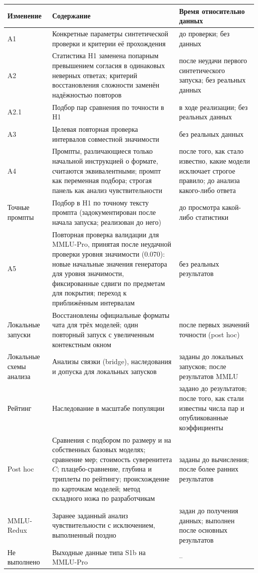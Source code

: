\documentclass[preprint,12pt,authoryear]{elsarticle}
\begin{document}
{\renewcommand{\arraystretch}{1.25}%
\begin{longtable}{@{}>{\raggedright\arraybackslash}p{}>{\raggedright\arraybackslash}p{}>{\raggedright\arraybackslash}p{}@{}}
\toprule
Изменение & Содержание & Время относительно данных \\
\midrule
\endhead
A1 & Конкретные параметры синтетической проверки и критерии её прохождения & до проверки; без данных \\
A2 & Статистика H1 заменена попарным превышением согласия в одинаковых неверных ответах; критерий восстановления сложности заменён надёжностью повторов & после неудачи первого синтетического запуска; без реальных данных \\
A2.1 & Подбор пар сравнения по точности в H1 & в ходе реализации; без реальных данных \\
A3 & Целевая повторная проверка интервалов совместной значимости & без реальных данных \\
A4 & Промпты, различающиеся только начальной инструкцией о формате, считаются эквивалентными; промпт как переменная подбора; строгая панель как анализ чувствительности & после того, как стало известно, какие модели исключает строгое правило; до анализа какого-либо ответа \\
Точные промпты & Подбор в H1 по точному тексту промпта (задокументирован после начала запуска; реализован до него) & до просмотра какой-либо статистики \\
A5 & Повторная проверка валидации для MMLU-Pro, принятая после неудачной проверки уровня значимости (0.070): новые начальные значения генератора для уровня значимости, фиксированные сдвиги по предметам для покрытия; переход к приближённым интервалам & без реальных результатов \\
Локальные запуски & Восстановлены официальные форматы чата для трёх моделей; один повторный запуск с увеличенным контекстным окном & после первых значений точности (post hoc) \\
Локальные схемы анализа & Анализы связки (bridge), наследования и допуска для локальных запусков & заданы до локальных запусков; после результатов MMLU \\
Рейтинг & Наследование в масштабе популяции & задано до результатов; после того, как стали известны числа пар и опубликованные коэффициенты \\
Post hoc & Сравнения с подбором по размеру и на собственных базовых моделях; сравнение мер; стоимость суверенитета $C$; плацебо-сравнение, глубина и триплеты по рейтингу; происхождение по карточкам моделей; метод складного ножа по разработчикам & заданы до вычисления; после более ранних результатов \\
MMLU-Redux & Заранее заданный анализ чувствительности с исключением, выполненный поздно & задан до получения данных; выполнен после основных результатов \\
Не выполнено & Выходные данные типа S1b на MMLU-Pro & -- \\
\bottomrule
\end{longtable}}
\end{document}
